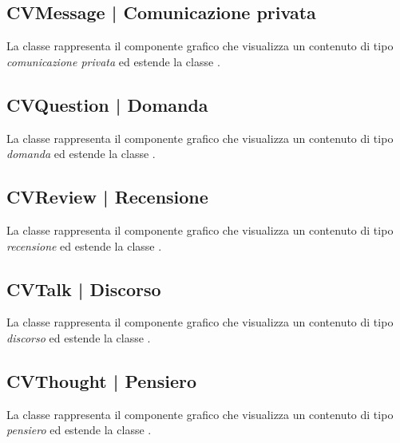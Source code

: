\documentclass[10pt,a4paper,headinclude,footinclude,hidelinks]{scrreprt} %
\begin{document}
	\subsection[CVMessage]{CVMessage | Comunicazione privata}
	\label{sec:stage:design:view:message}
	La classe \textit{} rappresenta il componente grafico che visualizza un contenuto di tipo \textit{comunicazione privata} ed estende la classe \textit{}.

	\subsection[CVQuestion]{CVQuestion | Domanda}
	\label{sec:stage:design:view:question}
	La classe \textit{} rappresenta il componente grafico che visualizza un contenuto di tipo \textit{domanda} ed estende la classe \textit{}.

	\subsection[CVReview]{CVReview | Recensione}
	\label{sec:stage:design:view:review}
	La classe \textit{} rappresenta il componente grafico che visualizza un contenuto di tipo \textit{recensione} ed estende la classe \textit{}.

	\subsection[CVTalk]{CVTalk | Discorso}
	\label{sec:stage:design:view:talk}
	La classe \textit{} rappresenta il componente grafico che visualizza un contenuto di tipo \textit{discorso} ed estende la classe \textit{}.

	\subsection[CVThought]{CVThought | Pensiero}
	\label{sec:stage:design:view:thought}
	La classe \textit{} rappresenta il componente grafico che visualizza un contenuto di tipo \textit{pensiero} ed estende la classe \textit{}.
\end{document}
